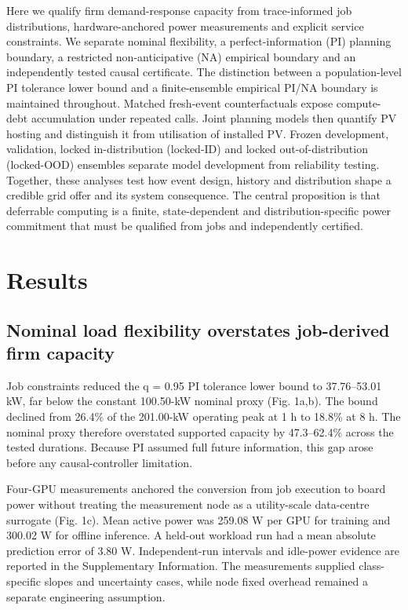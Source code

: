 \documentclass[10pt,a4paper]{article}
\begin{document}
Here we qualify firm demand-response capacity from trace-informed job distributions, hardware-anchored power measurements and explicit service constraints. We separate nominal flexibility, a perfect-information (PI) planning boundary, a restricted non-anticipative (NA) empirical boundary and an independently tested causal certificate. The distinction between a population-level PI tolerance lower bound and a finite-ensemble empirical PI/NA boundary is maintained throughout. Matched fresh-event counterfactuals expose compute-debt accumulation under repeated calls. Joint planning models then quantify PV hosting and distinguish it from utilisation of installed PV. Frozen development, validation, locked in-distribution (locked-ID) and locked out-of-distribution (locked-OOD) ensembles separate model development from reliability testing. Together, these analyses test how event design, history and distribution shape a credible grid offer and its system consequence. The central proposition is that deferrable computing is a finite, state-dependent and distribution-specific power commitment that must be qualified from jobs and independently certified.


\section*{Results}

\subsection*{Nominal load flexibility overstates job-derived firm capacity}

Job constraints reduced the q = 0.95 PI tolerance lower bound to 37.76–53.01 kW, far below the constant 100.50-kW nominal proxy (Fig. 1a,b). The bound declined from 26.4\% of the 201.00-kW operating peak at 1 h to 18.8\% at 8 h. The nominal proxy therefore overstated supported capacity by 47.3–62.4\% across the tested durations. Because PI assumed full future information, this gap arose before any causal-controller limitation.


Four-GPU measurements anchored the conversion from job execution to board power without treating the measurement node as a utility-scale data-centre surrogate (Fig. 1c). Mean active power was 259.08 W per GPU for training and 300.02 W for offline inference. A held-out workload run had a mean absolute prediction error of 3.80 W. Independent-run intervals and idle-power evidence are reported in the Supplementary Information. The measurements supplied class-specific slopes and uncertainty cases, while node fixed overhead remained a separate engineering assumption.
\end{document}
